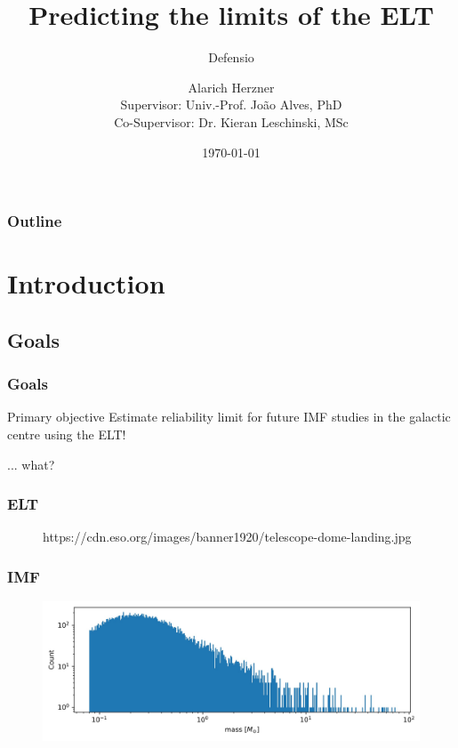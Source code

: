 \documentclass{beamer}
\title{Predicting the limits of the ELT}
\subtitle{Defensio}
\author[Alarich Herzner]{Alarich Herzner\\[1ex]  {\small Supervisor: Univ.-Prof. Jo\~ao Alves, PhD \\ Co-Supervisor: Dr. Kieran Leschinski, MSc}}
\institute{University of Vienna, Faculty of Physics}
\date{\today}
\begin{document}
\begin{frame}
\titlepage
\end{frame}

\begin{frame}
\frametitle{Outline}
\tableofcontents
\end{frame}

\section{Introduction}
\subsection{Goals}

\begin{frame}
\frametitle{Goals}
\begin{block}{Primary objective}
Estimate reliability limit for future IMF studies in the galactic centre using the ELT!
\end{block}
... what?
\end{frame}

\begin{frame}
\frametitle{ELT}
  \begin{figure}
                  {https://cdn.eso.org/images/banner1920/telescope-dome-landing.jpg}
  \end{figure}
\end{frame}

\begin{frame}
\frametitle{IMF}
  \begin{figure}
  \includegraphics[width=\linewidth]{Images/IMF1.jpg}
  \end{figure}
\end{frame}
\end{document}

